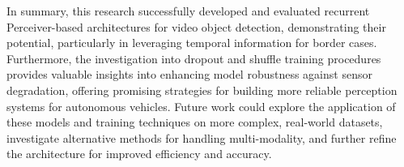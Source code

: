 In summary, this research successfully developed and evaluated recurrent Perceiver-based architectures for video object detection, demonstrating their potential, particularly in leveraging temporal information for border cases. Furthermore, the investigation into dropout and shuffle training procedures provides valuable insights into enhancing model robustness against sensor degradation, offering promising strategies for building more reliable perception systems for autonomous vehicles. Future work could explore the application of these models and training techniques on more complex, real-world datasets, investigate alternative methods for handling multi-modality, and further refine the architecture for improved efficiency and accuracy.
